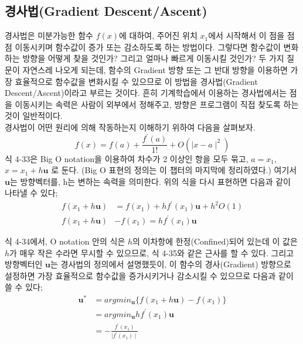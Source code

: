 \documentclass[a4paper]{oblivoir}
\begin{document}
\subsection{경사법(Gradient Descent/Ascent)}
경사법은 미분가능한 함수 $f(x)$에 대하여, 주어진 위치 $x_{1}$에서 시작해서 이 점을 점점 이동시키며 함수값이 증가 또는 감소하도록 하는 방법이다. 그렇다면 함수값이 변화하는 방향을 어떻게 찾을 것인가? 그리고 얼마나 빠르게 이동시킬 것인가? 두 가지 질문이 자연스레 나오게 되는데, 함수의 Gradient 방향 또는 그 반대 방향을 이용하면 가장 효율적으로 함수값을 변화시킬 수 있으므로 이 방법을 경사법(Gradient Descent/Ascent)이라고 부르는 것이다. 흔히 기계학습에서 이용하는 경사법에서는 점을 이동시키는 속력은 사람이 외부에서 정해주고, 방향은 프로그램이 직접 찾도록 하는 것이 일반적이다. \\
\indent 경사법이 어떤 원리에 의해 작동하는지 이해하기 위하여 다음을 살펴보자.
\begin{equation*}f(x) = f(a) + \frac{f^{\prime}(a)}{1!}+O(\mid x-a \mid^{2}) \tag{4-33} \end{equation*}
\indent 식 4-33은 Big O notation을 이용하여 차수가 2 이상인 항을 모두 묶고, $a=x_{1}$, $x=x_{1}+h\textbf{u}$ 로 둔다. (Big O 표현의 정의는 이 챕터의 마지막에 정리하였다.) 여기서 $\textbf{u}$는 방향벡터를, h는 변하는 속력을 의미한다. 위의 식을 다시 표현하면 다음과 같이 나타낼 수 있다;
\begin{align*}
f(x_{1}+h\textbf{u}) &= f(x_{1}) + hf^{\prime}(x_{1})\textbf{u} + h^{2}O(1) \tag{4-34} \\
f(x_{1}+h\textbf{u}) &- f(x_{1}) = hf^{\prime}(x_{1})\textbf{u} \tag{4-35}
\end{align*}

\indent 식 4-34에서, O notation 안의 식은 $h$의 이차항에 한정(Confined)되어 있는데 이 값은 $h$가 매우 작은 수라면 무시할 수 있으므로, 식 4-35와 같은 근사를 할 수 있다. 그리고 방향벡터인 $\textbf{u}$는 경사법의 정의에서 설명했듯이, 이 함수의 경사(Gradient) 방향으로 설정하면 가장 효율적으로 함수값을 증가시키거나 감소시킬 수 있으므로 다음과 같이 쓸 수 있다;
\begin{align*}
\textbf{u}^{\ast} &= argmin_{\textbf{u}}\{f(x_{1}+h\textbf{u})-f(x_{1})\} \tag{4-36} \\
&= argmin_{\textbf{u}}hf^{\prime}(x_{1})\textbf{u} \tag{4-37} \\
&= -\frac{f^{\prime}(x_{1})}{\mid f^{\prime}(x_{1}) \mid} \tag{4-38}
\end{align*}
\end{document}
